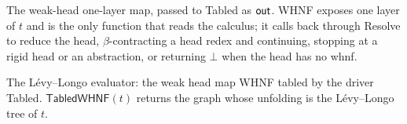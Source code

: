 \begin{algorithm*}
  \DontPrintSemicolon
  \caption{The weak-head one-layer map, passed to \textsf{Tabled} as $\outm$. \textsf{WHNF} exposes one layer of $t$ and is the only function that reads the calculus; it calls back through \textsf{Resolve} to reduce the head, $\beta$-contracting a head redex and continuing, stopping at a rigid head or an abstraction, or returning $\bot$ when the head has no whnf.}
  \label{alg:whnfmap}
\end{algorithm*}

\begin{algorithm}
  \DontPrintSemicolon
  \caption{The L\'evy--Longo evaluator: the weak head map \textsf{WHNF} tabled by the driver \textsf{Tabled}. $\textsf{TabledWHNF}(t)$ returns the graph whose unfolding is the L\'evy--Longo tree of $t$.}
  \label{alg:solvewhnf}
\end{algorithm}

